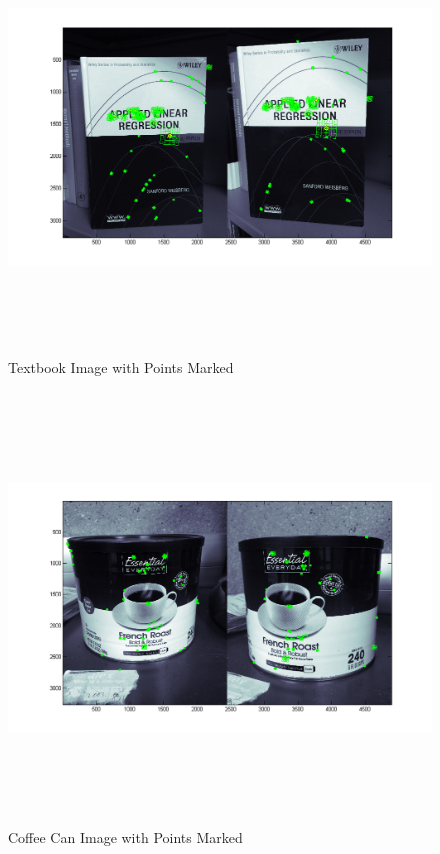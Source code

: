 \documentclass[11pt,psfig]{article}
\begin{document}
\begin{figure}[H]
\centering
\includegraphics[height=4.5in]{book_prob2Points2.png}
\caption{Textbook Image with Points Marked}
\label{p2b}
\end{figure}

\begin{figure}[H]
\centering
\includegraphics[height=4.5in]{coffeeCan_prob2Points2.png}
\caption{Coffee Can Image with Points Marked}
\label{p2c}
\end{figure}
\end{document}
